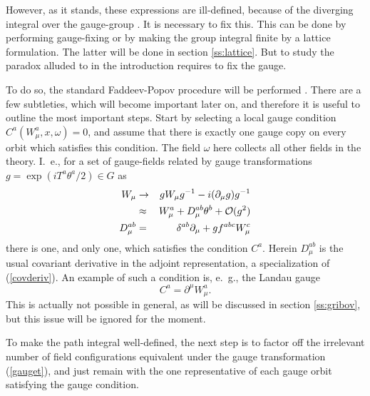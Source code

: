 \documentclass[final,12pt,3p,longtitle]{elsarticle}
\newcommand*{\no}{\noindent}
\newcommand*{\bea}{\begin{eqnarray}}
\newcommand*{\eea}{\end{eqnarray}}
\newcommand*{\be}{\begin{equation}}
\newcommand*{\ee}{\end{equation}}
\newcommand*{\pd}{\partial}
\newcommand*{\pdm}{\pd_{\mu}}
\newcommand*{\pref}[1]{(\ref{#1})}
\newcommand*{\nn}{\nonumber}
\newcommand*{\1}{1\!\!\!\bot}
\begin{document}
However, as it stands, these expressions are ill-defined, because of the diverging integral over the gauge-group \cite{Bohm:2001yx}. It is necessary to fix this. This can be done by performing gauge-fixing or by making the group integral finite by a lattice formulation. The latter will be done in section \ref{ss:lattice}. But to study the paradox alluded to in the introduction requires to fix the gauge.

To do so, the standard Faddeev-Popov procedure will be performed \cite{Bohm:2001yx}. There are a few subtleties, which will become important later on, and therefore it is useful to outline the most important steps. Start by selecting a local gauge condition $C^a(W_\mu^a,x,\omega)=0$, and assume that there is exactly one gauge copy on every orbit which satisfies this condition. The field $\omega$ here collects all other fields in the theory. I.\ e., for a set of gauge-fields related by gauge transformations $g=\exp(i T^a\theta^a/2)\in G$ as
\bea
W_\mu&\to& gW_\mu g^{-1}-i(\pdm g) g^{-1}\label{gauget}\\
&\approx& W_\mu^a+D_\mu^{ab}\theta^b+{\cal O}(g^2)\nn\\
D_\mu^{ab}&=&\delta^{ab}\pdm+gf^{abc}W_\mu^c\nn
\eea
there is one, and only one, which satisfies the condition $C^a$. Herein $D_\mu^{ab}$ is the usual covariant derivative in the adjoint representation, a specialization of \pref{covderiv}. An example of such a condition is, e.\ g., the Landau gauge 
\be
C^a=\pd^\mu W^a_\mu\label{landaug}.
\ee
\no This is actually not possible in general, as will be discussed in section \ref{ss:gribov}, but this issue will be ignored for the moment.

To make the path integral well-defined, the next step is to factor off the irrelevant number of field configurations equivalent under the gauge transformation \pref{gauget}, and just remain with the one representative of each gauge orbit satisfying the gauge condition.
\end{document}
